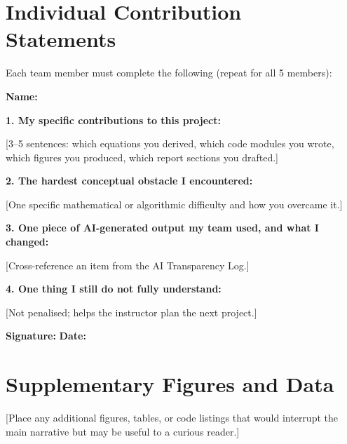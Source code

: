 \documentclass[11pt,a4paper]{article}
\theoremstyle{definition}
\theoremstyle{remark}
\begin{document}
\section{Individual Contribution Statements}

Each team member must complete the following (repeat for all 5 members):

\begin{formbox}
\textbf{Name:} \underline{\hspace{5cm}}

\vspace{0.5em}
\textbf{1. My specific contributions to this project:}

[3--5 sentences: which equations you derived, which code modules you wrote,
which figures you produced, which report sections you drafted.]

\vspace{0.5em}
\textbf{2. The hardest conceptual obstacle I encountered:}

[One specific mathematical or algorithmic difficulty and how you overcame it.]

\vspace{0.5em}
\textbf{3. One piece of AI-generated output my team used, and what I changed:}

[Cross-reference an item from the AI Transparency Log.]

\vspace{0.5em}
\textbf{4. One thing I still do not fully understand:}

[Not penalised; helps the instructor plan the next project.]

\vspace{0.5em}
\textbf{Signature:} \underline{\hspace{4cm}} \quad
\textbf{Date:} \underline{\hspace{2cm}}
\end{formbox}

\section{Supplementary Figures and Data}

[Place any additional figures, tables, or code listings that would interrupt
the main narrative but may be useful to a curious reader.]
\end{document}

